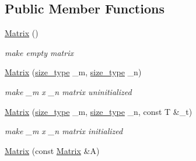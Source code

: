 \subsection*{Public Member Functions}
\begin{DoxyCompactItemize}
\item 
\hypertarget{classhdnum_1_1Matrix_ae8abe838fca01e6f98811c68b807fdb7}{
\hyperlink{classhdnum_1_1Matrix_ae8abe838fca01e6f98811c68b807fdb7}{Matrix} ()}
\label{classhdnum_1_1Matrix_ae8abe838fca01e6f98811c68b807fdb7}

\begin{DoxyCompactList}\small\item\em make empty matrix \item\end{DoxyCompactList}\item 
\hypertarget{classhdnum_1_1Matrix_afe276ea428efa8a82dc2eaa2bf35ff57}{
\hyperlink{classhdnum_1_1Matrix_afe276ea428efa8a82dc2eaa2bf35ff57}{Matrix} (\hyperlink{classhdnum_1_1Matrix_adeafaf5fa5732e0d67f90ffa2119fbf1}{size\_\-type} \_\-m, \hyperlink{classhdnum_1_1Matrix_adeafaf5fa5732e0d67f90ffa2119fbf1}{size\_\-type} \_\-n)}
\label{classhdnum_1_1Matrix_afe276ea428efa8a82dc2eaa2bf35ff57}

\begin{DoxyCompactList}\small\item\em make \_\-m x \_\-n matrix uninitialized \item\end{DoxyCompactList}\item 
\hypertarget{classhdnum_1_1Matrix_a59a74b9437fba7526e8dcec22adafa74}{
\hyperlink{classhdnum_1_1Matrix_a59a74b9437fba7526e8dcec22adafa74}{Matrix} (\hyperlink{classhdnum_1_1Matrix_adeafaf5fa5732e0d67f90ffa2119fbf1}{size\_\-type} \_\-m, \hyperlink{classhdnum_1_1Matrix_adeafaf5fa5732e0d67f90ffa2119fbf1}{size\_\-type} \_\-n, const T \&\_\-t)}
\label{classhdnum_1_1Matrix_a59a74b9437fba7526e8dcec22adafa74}

\begin{DoxyCompactList}\small\item\em make \_\-m x \_\-n matrix initialized \item\end{DoxyCompactList}\item 
\hypertarget{classhdnum_1_1Matrix_aa274920768bfee886c06f52638b068f7}{
\hyperlink{classhdnum_1_1Matrix_aa274920768bfee886c06f52638b068f7}{Matrix} (const \hyperlink{classhdnum_1_1Matrix}{Matrix} \&A)}
\label{classhdnum_1_1Matrix_aa274920768bfee886c06f52638b068f7}


\end{DoxyCompactItemize}
